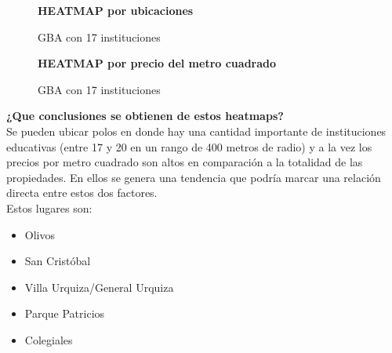 \documentclass[a4paper, 10pt]{article}
\newcommand\tab[1][0.5cm]{\hspace*{#1}}
\begin{document}
				\begin{figure}
    				\centering
    				\textbf{HEATMAP por ubicaciones}\par\medskip
    				\caption{GBA con 17 instituciones}
				\end{figure}
				\begin{figure}
    				\centering
    				\textbf{HEATMAP por precio del metro cuadrado}\par\medskip
    				\caption{GBA con 17 instituciones}
				\end{figure}
				\FloatBarrier

				\textbf{¿Que conclusiones se obtienen de estos heatmaps?}\\	
					\tab Se pueden ubicar polos en donde hay una cantidad importante de instituciones educativas 
					(entre 17 y 20 en un rango de 400 metros de radio) y a la vez los precios por metro 
					cuadrado son altos en comparación a la totalidad de las propiedades. En ellos se 
					genera una tendencia que podría marcar una relación directa entre estos dos factores.\\ 
					Estos lugares son:
					\begin{itemize}
					\item Olivos
					\item San Cristóbal
					\item Villa Urquiza/General Urquiza
					\item Parque Patricios
					\item Colegiales
					\end{itemize}						
\end{document}
